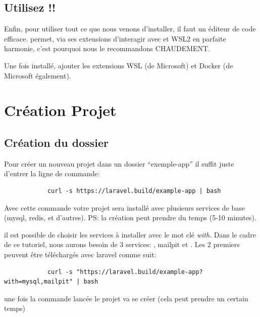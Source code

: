 \documentclass[internal]{nhitec_design}
\begin{document}
    \subsection[VS Code]{Utilisez \vscode!!}
    Enfin, pour utiliser tout ce que nous venons d'installer, il faut un éditeur de code efficace. \href{https://code.visualstudio.com/}{\vscode{}} permet, via ses extensions d'interagir avec \docker{} et WSL2 en parfaite harmonie, c'est pourquoi nous le recommandons CHAUDEMENT. 

    Une fois \vscode{} installé, ajouter les extensions WSL (de Microsoft) et Docker (de Microsoft également).





\newpage
\section[Création Projet Laravel]{Création Projet \laravel{}}

    \subsection{Création du dossier}
        Pour créer un nouveau projet \laravel{} dans un dossier ``exemple-app'' il suffit juste d'entrer la ligne de commande:

        \begin{lstlisting}
            curl -s https://laravel.build/example-app | bash
        \end{lstlisting}

        Avec cette commande votre projet sera installé avec plusieurs services de base (mysql, redis, et d'autres). PS: la création peut prendre du temps (5-10 minutes).

        il est possible de choisir les services à installer avec le mot clé \textit{with}. Dans le cadre de ce tutoriel, nous aurons besoin de 3 services: \mysql, mailpit et \phpmyadmin. Les 2 premiers peuvent être téléchargés avec laravel comme suit:

        \begin{lstlisting}
            curl -s "https://laravel.build/example-app?with=mysql,mailpit" | bash
        \end{lstlisting}

        une fois la commande lancée le projet va se créer (cela peut prendre un certain temps)
\end{document}
